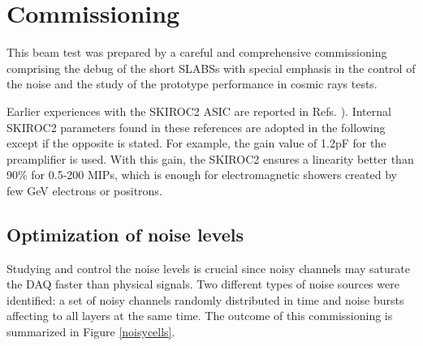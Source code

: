 \documentclass[final,3p,times,twocolumn]{elsarticle}
\begin{document}
\section{Commissioning}
\label{sec:commissioning}

This beam test was prepared by a careful and comprehensive commissioning comprising
the debug of the
short SLABSs with special emphasis in the control of the noise and the study of the
prototype performance in cosmic rays tests.

Earlier experiences with the SKIROC2 ASIC are reported in Refs. \cite{Amjad:2014tha,Suehara:2018mqk}). 
Internal SKIROC2 parameters found in these references are adopted in the following
except if the opposite is stated.
For example, the gain value of 1.2pF for the preamplifier is used. 
With this gain, the SKIROC2 ensures a linearity better than 90\% 
for 0.5-200 MIPs, which is enough for 
electromagnetic showers created by few GeV 
electrons or positrons.


\subsection{Optimization of noise levels}
\label{sec:comm_noise}

Studying and control the noise levels
is crucial since noisy channels may saturate the DAQ faster than physical signals.
Two different types of noise sources were identified:
a set of noisy channels randomly distributed in time 
and noise bursts affecting to all layers at the same time.
The outcome of this commissioning is summarized in Figure \ref{noisycells}.
\end{document}
